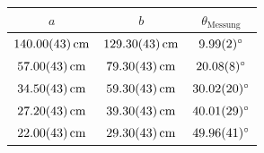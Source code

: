 \begin{tabular}{|c|c|c|}
\hline
$a$ & $b$ & $\theta_{\text{Messung}}$ \\
\hline
$\SI{140.00 \pm 0.43}{\centi\meter}$ & $\SI{129.30 \pm 0.43}{\centi\meter}$ & $\SI{9.99 \pm 0.02}{\degree}$ \\
\hline
$\SI{57.00 \pm 0.43}{\centi\meter}$ & $\SI{79.30 \pm 0.43}{\centi\meter}$ & $\SI{20.08 \pm 0.08}{\degree}$ \\
\hline
$\SI{34.50 \pm 0.43}{\centi\meter}$ & $\SI{59.30 \pm 0.43}{\centi\meter}$ & $\SI{30.02 \pm 0.20}{\degree}$ \\
\hline
$\SI{27.20 \pm 0.43}{\centi\meter}$ & $\SI{39.30 \pm 0.43}{\centi\meter}$ & $\SI{40.01 \pm 0.29}{\degree}$ \\
\hline
$\SI{22.00 \pm 0.43}{\centi\meter}$ & $\SI{29.30 \pm 0.43}{\centi\meter}$ & $\SI{49.96 \pm 0.41}{\degree}$ \\
\hline
\end{tabular}
